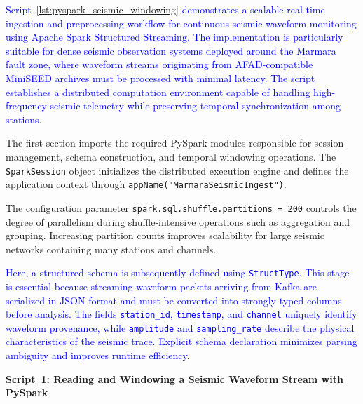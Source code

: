 \documentclass[data,article,submit,pdftex,moreauthors]{Definitions/mdpi}
\begin{document}
\textcolor{blue}{Script~\ref{lst:pyspark_seismic_windowing} demonstrates a scalable real-time ingestion and preprocessing workflow for continuous seismic waveform monitoring using Apache Spark Structured Streaming. The implementation is particularly suitable for dense seismic observation systems deployed around the Marmara fault zone, where waveform streams originating from AFAD-compatible MiniSEED archives must be processed with minimal latency. The script establishes a distributed computation environment capable of handling high-frequency seismic telemetry while preserving temporal synchronization among stations}.

The first section imports the required PySpark modules responsible for session management, schema construction, and temporal windowing operations. The \texttt{SparkSession} object initializes the distributed execution engine and defines the application context through
\texttt{appName("MarmaraSeismicIngest")}. 

The configuration parameter
\texttt{spark.sql.shuffle.partitions = 200}
controls the degree of parallelism during shuffle-intensive operations such as aggregation and grouping. Increasing partition counts improves scalability for large seismic networks containing many stations and channels.

\textcolor{blue}{Here, a structured schema is subsequently defined using \texttt{StructType}. This stage is essential because streaming waveform packets arriving from Kafka are serialized in JSON format and must be converted into strongly typed columns before analysis. The fields \texttt{station\_id}, \texttt{timestamp}, and \texttt{channel} uniquely identify waveform provenance, while \texttt{amplitude} and \texttt{sampling\_rate} describe the physical characteristics of the seismic trace. Explicit schema declaration minimizes parsing ambiguity and improves runtime efficiency}.

\textbf{Script~1: Reading and Windowing a Seismic Waveform Stream with PySpark}
\end{document}
